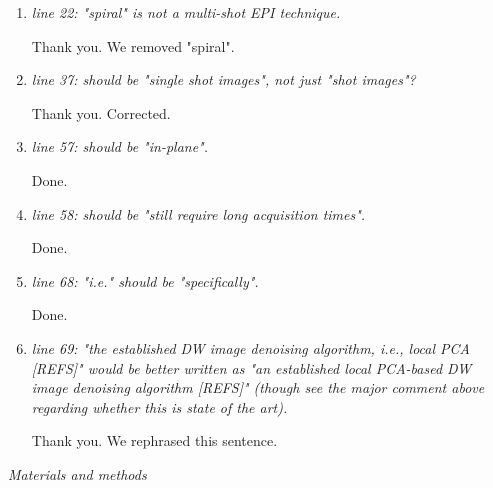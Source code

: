 \documentclass[a4paper,11pt,twoside]{report}
\begin{document}
\begin{enumerate}[resume]
    \item \textit{line 22: "spiral" is not a multi-shot EPI technique.}

    \hspace{1em} Thank you. We removed "spiral".

    \item \textit{line 37: should be "single shot images", not just "shot images"?}

    \hspace{1em} Thank you. Corrected.

    \item \textit{line 57: should be "in-plane".}

    \hspace{1em} Done.

    \item \textit{line 58: should be "still require long acquisition times".}

    \hspace{1em} Done.

    \item \textit{line 68: "i.e." should be "specifically".}

    \hspace{1em} Done.

    \item \textit{line 69: "the established DW image denoising algorithm, i.e., local PCA [REFS]" would be better written as "an established local PCA-based DW image denoising algorithm [REFS]" (though see the major comment above regarding whether this is state of the art).}

    \hspace{1em} Thank you. We rephrased this sentence.

\end{enumerate}


\noindent \textit{Materials and methods}
\end{document}
